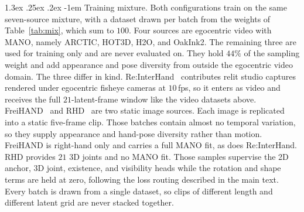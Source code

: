 \documentclass[10pt,twocolumn,letterpaper]{article}
\makeatletter
\renewcommand\paragraph{\@startsection{paragraph}{4}{\z@}%
  {1.3ex \@plus .25ex \@minus .2ex}%
  {-1em}%
  {\normalfont\normalsize\bfseries}}
\makeatother
\begin{document}
\paragraph{Training mixture.} Both configurations train on the same seven-source mixture, with a dataset drawn per batch from the weights of Table~\ref{tab:mix}, which sum to $100$. Four sources are egocentric video with MANO, namely ARCTIC, HOT3D, H2O, and OakInk2. The remaining three are used for training only and are never evaluated on. They hold $44\%$ of the sampling weight and add appearance and pose diversity from outside the egocentric video domain. The three differ in kind. Re:InterHand~\citep{reinterhand2023} contributes relit studio captures rendered under egocentric fisheye cameras at $10$\,fps, so it enters as video and receives the full $21$-latent-frame window like the video datasets above. FreiHAND~\citep{freihand2019} and RHD~\citep{rhd2017} are two static image sources. Each image is replicated into a static five-frame clip. Those batches contain almost no temporal variation, so they supply appearance and hand-pose diversity rather than motion. FreiHAND is right-hand only and carries a full MANO fit, as does Re:InterHand. RHD provides $21$ 3D joints and no MANO fit. Those samples supervise the 2D anchor, 3D joint, existence, and visibility heads while the rotation and shape terms are held at zero, following the loss routing described in the main text. Every batch is drawn from a single dataset, so clips of different length and different latent grid are never stacked together.
\end{document}
